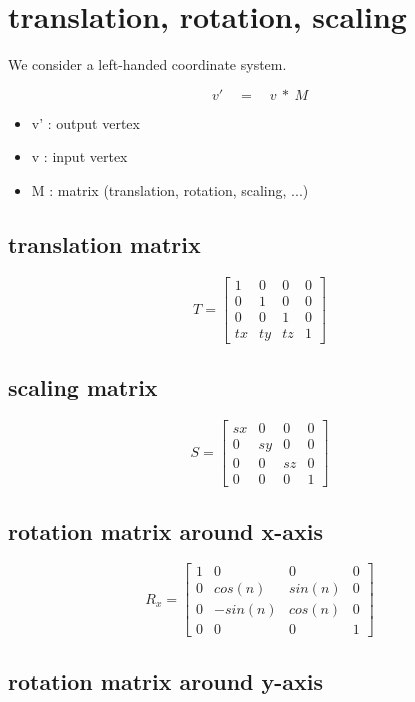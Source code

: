 \documentclass[12pt]{article}
\begin{document}
\section{translation, rotation, scaling}

We consider a left-handed coordinate system.

$$ v' \quad = \quad v \ * \ M $$

\begin{itemize}
\item v' : output vertex
\item v : input vertex
\item M : matrix (translation, rotation, scaling, ...)
\end{itemize}

\subsection {translation matrix}

$$
T = 
\begin{bmatrix}
1 & 0 & 0 & 0 \\
0 & 1 & 0 & 0 \\
0 & 0 & 1 & 0 \\
tx & ty & tz & 1
\end{bmatrix}
$$

\subsection {scaling matrix}

$$
S = 
\begin{bmatrix}
sx & 0 & 0 & 0 \\
0 & sy & 0 & 0 \\
0 & 0 & sz & 0 \\
0 & 0 & 0 & 1
\end{bmatrix}
$$

\subsection {rotation matrix around x-axis}

$$
R_x = 
\begin{bmatrix}
1 & 0 & 0 & 0 \\
0 & cos(n) & sin(n) & 0 \\
0 & -sin(n) & cos(n) & 0 \\
0 & 0 & 0 & 1
\end{bmatrix}
$$

\subsection {rotation matrix around y-axis}
\end{document}
